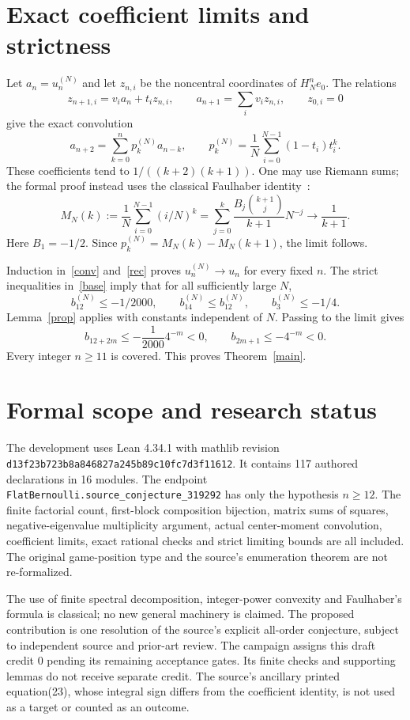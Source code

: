 \documentclass[11pt]{article}
\begin{document}
\section{Exact coefficient limits and strictness}
Let $a_n=u_n^{(N)}$ and let $z_{n,i}$ be the noncentral coordinates of
$H_N^ne_0$. The relations
\[
 z_{n+1,i}=v_ia_n+t_iz_{n,i},\qquad
 a_{n+1}=\sum_i v_iz_{n,i},\qquad z_{0,i}=0
\]
give the exact convolution
\begin{equation}\label{conv}
 a_{n+2}=\sum_{k=0}^np_k^{(N)}a_{n-k},\qquad
 p_k^{(N)}=\frac1N\sum_{i=0}^{N-1}(1-t_i)t_i^k.
\end{equation}
These coefficients tend to $1/((k+2)(k+1))$. One may use Riemann sums;
the formal proof instead uses the classical Faulhaber identity~\cite{M}:
\[
 M_N(k):=\frac1N\sum_{i=0}^{N-1}(i/N)^k
 =\sum_{j=0}^k\frac{B_j\binom{k+1}{j}}{k+1}N^{-j}
 \longrightarrow\frac1{k+1}.
\]
Here $B_1=-1/2$. Since $p_k^{(N)}=M_N(k)-M_N(k+1)$, the limit follows.

\newpage
Induction in~\eqref{conv} and~\eqref{rec} proves
$u_n^{(N)}\to u_n$ for every fixed $n$. The strict inequalities
in~\eqref{base} imply that for all sufficiently large $N$,
\[
 b_{12}^{(N)}\le-1/2000,\qquad b_{14}^{(N)}\le b_{12}^{(N)},\qquad
 b_3^{(N)}\le-1/4.
\]
Lemma~\ref{prop} applies with constants independent of $N$.
Passing to the limit gives
\[
 b_{12+2m}\le-\frac1{2000}4^{-m}<0,\qquad b_{2m+1}\le-4^{-m}<0.
\]
Every integer $n\ge11$ is covered. This proves Theorem~\ref{main}.

\section{Formal scope and research status}
The development uses Lean 4.34.1 with mathlib revision
\texttt{d13f23b723b8a846827a245b89c10fc7d3f11612}.
It contains 117 authored declarations in 16 modules. The endpoint
\texttt{FlatBernoulli.source\_conjecture\_319292} has only the hypothesis
$n\ge12$. The finite factorial count, first-block composition bijection,
matrix sums of squares, negative-eigenvalue multiplicity argument, actual
center-moment convolution, coefficient limits, exact rational checks and
strict limiting bounds are all included. The original game-position type
and the source's enumeration theorem are not re-formalized.

The use of finite spectral decomposition, integer-power convexity and
Faulhaber's formula is classical; no new general machinery is claimed.
The proposed contribution is one resolution of the source's explicit
all-order conjecture, subject to independent source and prior-art review.
The campaign assigns this draft credit 0 pending its remaining acceptance
gates. Its finite checks and supporting lemmas do not receive separate credit.
The source's ancillary printed equation(23), whose integral sign differs
from the coefficient identity, is not used as a target or counted as an outcome.
\end{document}
